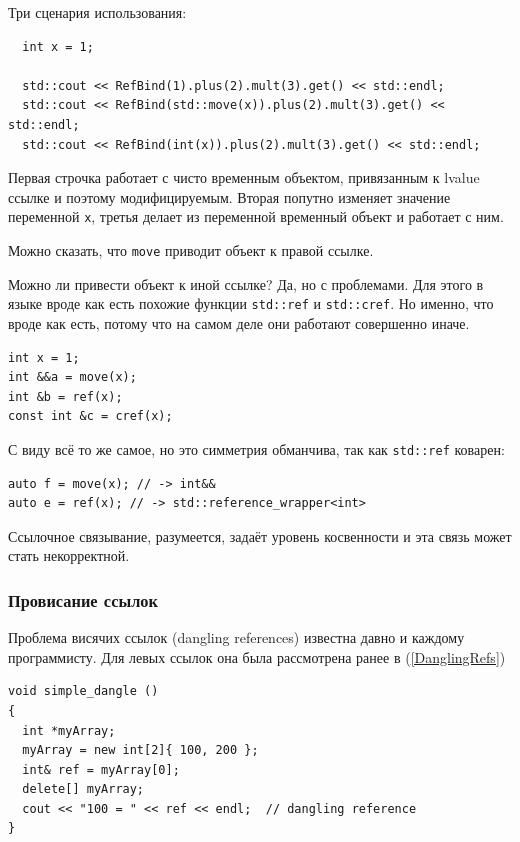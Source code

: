 \documentclass[a4paper,12pt,oneside]{article}
\begin{document}
Три сценария использования:

\begin{lstlisting}
  int x = 1;

  std::cout << RefBind(1).plus(2).mult(3).get() << std::endl;
  std::cout << RefBind(std::move(x)).plus(2).mult(3).get() << std::endl;
  std::cout << RefBind(int(x)).plus(2).mult(3).get() << std::endl;
\end{lstlisting}

Первая строчка работает с чисто временным объектом, привязанным к lvalue ссылке и поэтому модифицируемым. Вторая попутно изменяет значение переменной \lstinline!x!, третья делает из переменной временный объект и работает с ним.

Можно сказать, что \lstinline!move! приводит объект к правой ссылке.

Можно ли привести объект к иной ссылке? Да, но с проблемами. Для этого в языке вроде как есть похожие функции \lstinline!std::ref! и \lstinline!std::cref!. Но именно, что вроде как есть, потому что на самом деле они работают совершенно иначе.

\begin{lstlisting}
int x = 1;
int &&a = move(x);
int &b = ref(x); 
const int &c = cref(x);
\end{lstlisting}

С виду всё то же самое, но это симметрия обманчива, так как \lstinline!std::ref! коварен:

\begin{lstlisting}
auto f = move(x); // -> int&&
auto e = ref(x); // -> std::reference_wrapper<int> 
\end{lstlisting}

Ссылочное связывание, разумеется, задаёт уровень косвенности и эта связь может стать некорректной.

\subsubsection{Провисание ссылок}\label{subsub:danglingrefs}

Проблема висячих ссылок (dangling references) известна давно и каждому программисту. Для левых ссылок она была рассмотрена ранее в (\ref{DanglingRefs})

\begin{lstlisting}
void simple_dangle ()
{
  int *myArray;
  myArray = new int[2]{ 100, 200 };
  int& ref = myArray[0];
  delete[] myArray;
  cout << "100 = " << ref << endl;  // dangling reference  
}
\end{lstlisting}
\end{document}
